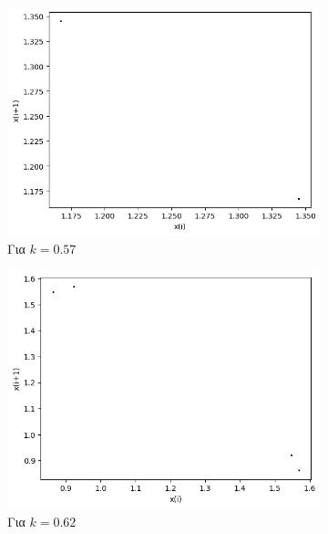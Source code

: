 \begin{figure}[ht]
\begin{subfigure}[b]{0.4\textwidth}
		\includegraphics[width=\textwidth]{LateX images/graphs q09/g5}
		\caption{Για $k=0.57$}
		\label{f:k50}
	\end{subfigure}
	\hfill
	\begin{subfigure}[b]{0.4\textwidth}
		\centering
		\includegraphics[width=\textwidth]{LateX images/graphs q09/g6}
		\caption{Για $k=0.62$}
		\label{f:k51}
	\end{subfigure}
	\hfill
	\begin{subfigure}[b]{0.4\textwidth}
		\centering

\end{subfigure}
\end{figure}
